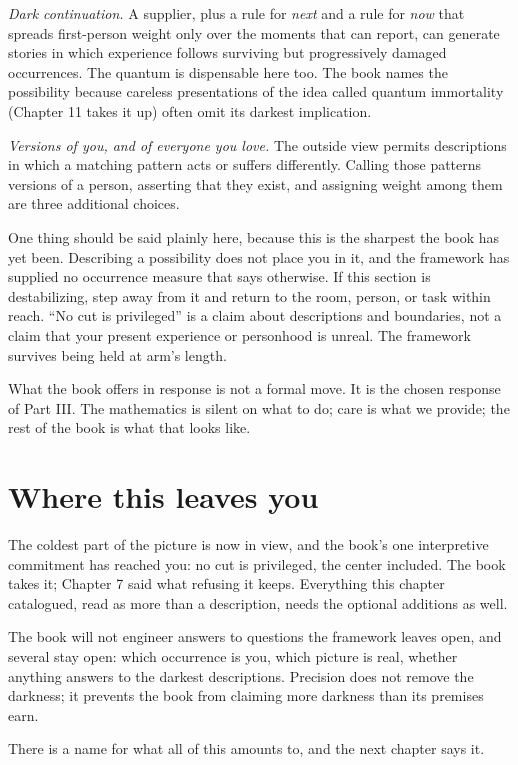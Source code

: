 \emph{Dark continuation.} A supplier, plus a rule for \emph{next} and a rule for \emph{now} that spreads first-person weight only over the moments that can report, can generate stories in which experience follows surviving but progressively damaged occurrences. The quantum is dispensable here too. The book names the possibility because careless presentations of the idea called quantum immortality (Chapter 11 takes it up) often omit its darkest implication.

\emph{Versions of you, and of everyone you love.} The outside view permits descriptions in which a matching pattern acts or suffers differently. Calling those patterns versions of a person, asserting that they exist, and assigning weight among them are three additional choices.

One thing should be said plainly here, because this is the sharpest the book has yet been. Describing a possibility does not place you in it, and the framework has supplied no occurrence measure that says otherwise. If this section is destabilizing, step away from it and return to the room, person, or task within reach. ``No cut is privileged'' is a claim about descriptions and boundaries, not a claim that your present experience or personhood is unreal. The framework survives being held at arm's length.

What the book offers in response is not a formal move. It is the chosen response of Part III. The mathematics is silent on what to do; care is what we provide; the rest of the book is what that looks like.

\section*{Where this leaves you}

The coldest part of the picture is now in view, and the book's one interpretive commitment has reached you: no cut is privileged, the center included. The book takes it; Chapter 7 said what refusing it keeps. Everything this chapter catalogued, read as more than a description, needs the optional additions as well.

The book will not engineer answers to questions the framework leaves open, and several stay open: which occurrence is you, which picture is real, whether anything answers to the darkest descriptions. Precision does not remove the darkness; it prevents the book from claiming more darkness than its premises earn.

There is a name for what all of this amounts to, and the next chapter says it.
